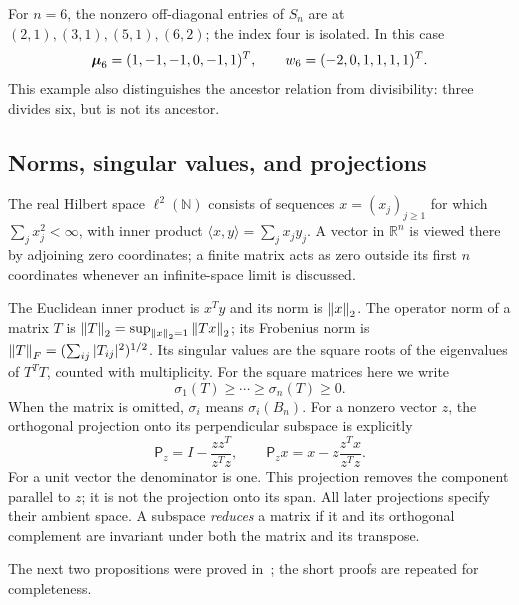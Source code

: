 For $n=6$, the nonzero off-diagonal entries of $S_n$ are at $(2,1),(3,1),(5,1),(6,2)$; the index four is isolated. In this case
\[
 \boldsymbol{\mu}_6=(1,-1,-1,0,-1,1)^T,\qquad
 w_6=(-2,0,1,1,1,1)^T.
\]
This example also distinguishes the ancestor relation from divisibility: three divides six, but is not its ancestor.

\subsection{Norms, singular values, and projections}

The real Hilbert space $\ell^2(\mathbb N)$ consists of sequences $x=(x_j)_{j\ge1}$ for which $\sum_jx_j^2<\infty$, with inner product $\langle x,y\rangle=\sum_jx_jy_j$. A vector in $\mathbb R^n$ is viewed there by adjoining zero coordinates; a finite matrix acts as zero outside its first $n$ coordinates whenever an infinite-space limit is discussed.

The Euclidean inner product is $x^Ty$ and its norm is $\left\lVert x\right\rVert_2$. The operator norm of a matrix $T$ is $\left\lVert T\right\rVert_2=\sup_{\left\lVert x\right\rVert_2=1}\left\lVert Tx\right\rVert_2$; its Frobenius norm is $\left\lVert T\right\rVert_F=(\sum_{ij}|T_{ij}|^2)^{1/2}$. Its singular values are the square roots of the eigenvalues of $T^TT$, counted with multiplicity. For the square matrices here we write
\[
 \sigma_1(T)\ge\cdots\ge\sigma_n(T)\ge0.
\]
When the matrix is omitted, $\sigma_i$ means $\sigma_i(B_n)$. For a nonzero vector $z$, the orthogonal projection onto its perpendicular subspace is explicitly
\begin{equation}\label{def:projection}
 \mathsf P_z=I-\frac{zz^T}{z^Tz},\qquad
 \mathsf P_z x=x-z\frac{z^Tx}{z^Tz}.
\end{equation}
For a unit vector the denominator is one. This projection removes the component parallel to $z$; it is not the projection onto its span. All later projections specify their ambient space. A subspace \emph{reduces} a matrix if it and its orthogonal complement are invariant under both the matrix and its transpose.

The next two propositions were proved in~\cite{klineSmallest}; the short proofs are repeated for completeness.

